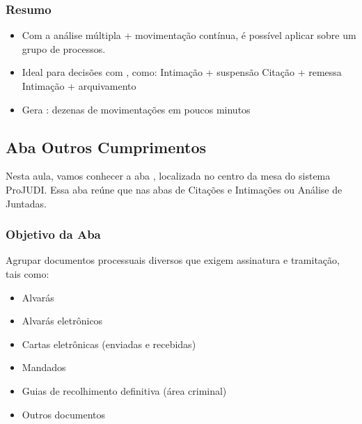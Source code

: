 \documentclass[letterpaper,10pt,brazil]{sphinxmanual}
\begin{document}
\subsubsection{Resumo}
\label{\detokenize{projud_08_multiplaeunitariamov:resumo}}\begin{itemize}
\item {} 
\sphinxAtStartPar
Com a análise múltipla + movimentação contínua, é possível aplicar  sobre um grupo de processos.

\item {} 
\sphinxAtStartPar
Ideal para decisões com , como:
\sphinxhyphen{} Intimação + suspensão
\sphinxhyphen{} Citação + remessa
\sphinxhyphen{} Intimação + arquivamento

\item {} 
\sphinxAtStartPar
Gera : dezenas de movimentações em poucos minutos

\end{itemize}

\sphinxstepscope


\subsection{Aba Outros Cumprimentos}
\label{\detokenize{projud_09_outroscumprimentos:aba-outros-cumprimentos}}\label{\detokenize{projud_09_outroscumprimentos::doc}}
\sphinxAtStartPar
Nesta aula, vamos conhecer a aba , localizada no centro da mesa do sistema ProJUDI. Essa aba reúne  que  nas abas de Citações e Intimações ou Análise de Juntadas.


\subsubsection{Objetivo da Aba}
\label{\detokenize{projud_09_outroscumprimentos:objetivo-da-aba}}
\sphinxAtStartPar
Agrupar documentos processuais diversos que exigem assinatura e tramitação, tais como:
\begin{itemize}
\item {} 
\sphinxAtStartPar
Alvarás

\item {} 
\sphinxAtStartPar
Alvarás eletrônicos

\item {} 
\sphinxAtStartPar
Cartas eletrônicas (enviadas e recebidas)

\item {} 
\sphinxAtStartPar
Mandados

\item {} 
\sphinxAtStartPar
Guias de recolhimento definitiva (área criminal)

\item {} 
\sphinxAtStartPar
Outros documentos

\end{itemize}
\end{document}
